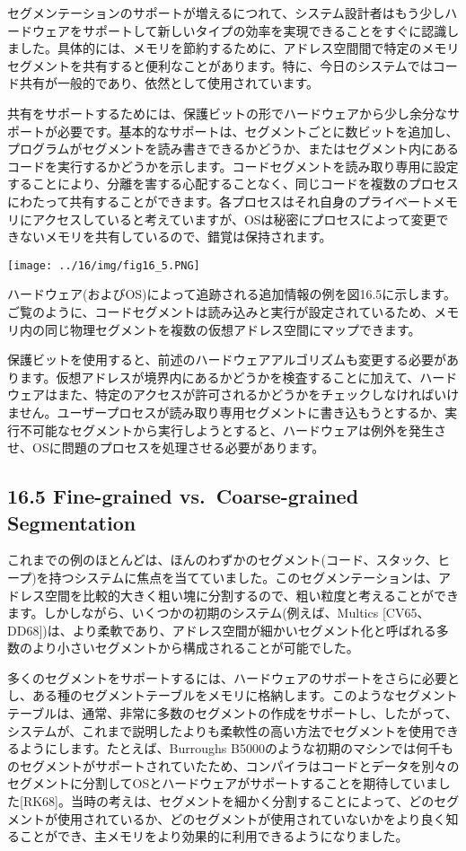 セグメンテーションのサポートが増えるにつれて、システム設計者はもう少しハードウェアをサポートして新しいタイプの効率を実現できることをすぐに認識しました。具体的には、メモリを節約するために、アドレス空間間で特定のメモリセグメントを共有すると便利なことがあります。特に、今日のシステムではコード共有が一般的であり、依然として使用されています。

共有をサポートするためには、保護ビットの形でハードウェアから少し余分なサポートが必要です。基本的なサポートは、セグメントごとに数ビットを追加し、プログラムがセグメントを読み書きできるかどうか、またはセグメント内にあるコードを実行するかどうかを示します。コードセグメントを読み取り専用に設定することにより、分離を害する心配することなく、同じコードを複数のプロセスにわたって共有することができます。各プロセスはそれ自身のプライベートメモリにアクセスしていると考えていますが、OSは秘密にプロセスによって変更できないメモリを共有しているので、錯覚は保持されます。

\texttt{[image: ../16/img/fig16\_5.PNG]}

ハードウェア(およびOS)によって追跡される追加情報の例を図16.5に示します。ご覧のように、コードセグメントは読み込みと実行が設定されているため、メモリ内の同じ物理セグメントを複数の仮想アドレス空間にマップできます。

保護ビットを使用すると、前述のハードウェアアルゴリズムも変更する必要があります。仮想アドレスが境界内にあるかどうかを検査することに加えて、ハードウェアはまた、特定のアクセスが許可されるかどうかをチェックしなければいけません。ユーザープロセスが読み取り専用セグメントに書き込もうとするか、実行不可能なセグメントから実行しようとすると、ハードウェアは例外を発生させ、OSに問題のプロセスを処理させる必要があります。

\hypertarget{fine-grained-vs.-coarse-grained-segmentation}{%
\subsection*{16.5 Fine-grained vs.~Coarse-grained
Segmentation}\label{fine-grained-vs.-coarse-grained-segmentation}}

これまでの例のほとんどは、ほんのわずかのセグメント(コード、スタック、ヒープ)を持つシステムに焦点を当てていました。このセグメンテーションは、アドレス空間を比較的大きく粗い塊に分割するので、粗い粒度と考えることができます。しかしながら、いくつかの初期のシステム(例えば、Multics
{[}CV65、DD68{]})は、より柔軟であり、アドレス空間が細かいセグメント化と呼ばれる多数のより小さいセグメントから構成されることが可能でした。

多くのセグメントをサポートするには、ハードウェアのサポートをさらに必要とし、ある種のセグメントテーブルをメモリに格納します。このようなセグメントテーブルは、通常、非常に多数のセグメントの作成をサポートし、したがって、システムが、これまで説明したよりも柔軟性の高い方法でセグメントを使用できるようにします。たとえば、Burroughs
B5000のような初期のマシンでは何千ものセグメントがサポートされていたため、コンパイラはコードとデータを別々のセグメントに分割してOSとハードウェアがサポートすることを期待していました{[}RK68{]}。当時の考えは、セグメントを細かく分割することによって、どのセグメントが使用されているか、どのセグメントが使用されていないかをより良く知ることができ、主メモリをより効果的に利用できるようになりました。

